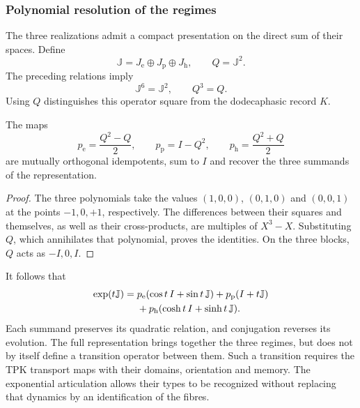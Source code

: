 \subsubsection{Polynomial resolution of the regimes}

The three realizations admit a compact presentation on the direct
sum of their spaces. Define
\[
 \mathbb J=J_{\mathrm e}\oplus J_{\mathrm p}\oplus J_{\mathrm h},
 \qquad Q=\mathbb J^2.
\]
The preceding relations imply
\[
 \mathbb J^6=\mathbb J^2,\qquad Q^3=Q.
\]
Using \(Q\) distinguishes this operator square from the
dodecaphasic record \(K\).

\begin{proposition}
\label{geo-euler-trit-proyectores}
The maps
\[
 p_{\mathrm e}=\frac{Q^2-Q}{2},\qquad
 p_{\mathrm p}=I-Q^2,\qquad
 p_{\mathrm h}=\frac{Q^2+Q}{2}
\]
are mutually orthogonal idempotents, sum to \(I\) and recover the three
summands of the representation.
\end{proposition}
\begin{proof}
The three polynomials take the values \((1,0,0)\), \((0,1,0)\) and
\((0,0,1)\) at the points \(-1,0,+1\), respectively. The differences
between their squares and themselves, as well as their cross-products, are
multiples of \(X^3-X\). Substituting \(Q\), which annihilates that polynomial, proves
the identities. On the three blocks, \(Q\) acts as \(-I,0,I\).
\end{proof}

It follows that
\begin{align}
 \exp(t\mathbb J)
 ={}&p_{\mathrm e}(\cos t\,I+\sin t\,\mathbb J)
   +p_{\mathrm p}(I+t\mathbb J)\notag\\
   &+p_{\mathrm h}(\cosh t\,I+\sinh t\,\mathbb J).
 \label{geo-euler-trit-exponencial-total}
\end{align}
Each summand preserves its quadratic relation, and conjugation reverses
its evolution. The full representation brings together the three regimes, but does not
by itself define a transition operator between them. Such a transition
requires the TPK transport maps with their domains, orientation and
memory. The exponential articulation allows their types to be recognized without
replacing that dynamics by an identification of the fibres.

